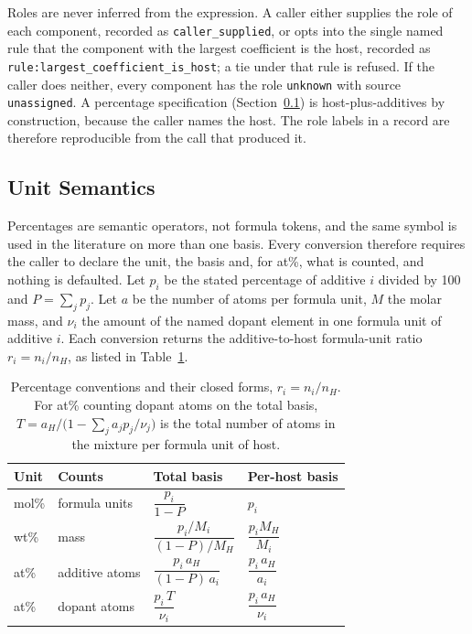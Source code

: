 \documentclass[10pt,journal]{IEEEtran}
\renewcommand{\arraystretch}{1.15}
\begin{document}
Roles are never inferred from the expression. A caller either supplies the role of each component, recorded as \texttt{caller\_supplied}, or opts into the single named rule that the component with the largest coefficient is the host, recorded as \texttt{rule:largest\_coefficient\_is\_host}; a tie under that rule is refused. If the caller does neither, every component has the role \texttt{unknown} with source \texttt{unassigned}. A percentage specification (Section~\ref{sec:units}) is host-plus-additives by construction, because the caller names the host. The role labels in a record are therefore reproducible from the call that produced it.

\subsection{Unit Semantics}
\label{sec:units}
Percentages are semantic operators, not formula tokens, and the same symbol is used in the literature on more than one basis. Every conversion therefore requires the caller to declare the unit, the basis and, for at\%, what is counted, and nothing is defaulted. Let $p_i$ be the stated percentage of additive $i$ divided by 100 and $P=\sum_j p_j$. Let $a$ be the number of atoms per formula unit, $M$ the molar mass, and $\nu_i$ the amount of the named dopant element in one formula unit of additive $i$. Each conversion returns the additive-to-host formula-unit ratio $r_i=n_i/n_H$, as listed in Table~\ref{tab:conventions}.

\begin{table}[!t]
\centering
\caption{Percentage conventions and their closed forms, $r_i=n_i/n_H$. For at\% counting dopant atoms on the total basis, $T=a_H/\bigl(1-\sum_j a_j p_j/\nu_j\bigr)$ is the total number of atoms in the mixture per formula unit of host.}
\label{tab:conventions}
\footnotesize
\renewcommand{\arraystretch}{1.6}
\begin{tabular}{@{}llll@{}}
\toprule
Unit & Counts & Total basis & Per-host basis \\
\midrule
mol\% & formula units & $\dfrac{p_i}{1-P}$ & $p_i$ \\
wt\% & mass & $\dfrac{p_i/M_i}{(1-P)/M_H}$ & $\dfrac{p_i M_H}{M_i}$ \\
at\% & additive atoms & $\dfrac{p_i\,a_H}{(1-P)\,a_i}$ & $\dfrac{p_i\,a_H}{a_i}$ \\
at\% & dopant atoms & $\dfrac{p_i\,T}{\nu_i}$ & $\dfrac{p_i\,a_H}{\nu_i}$ \\
\bottomrule
\end{tabular}
\end{table}
\end{document}
